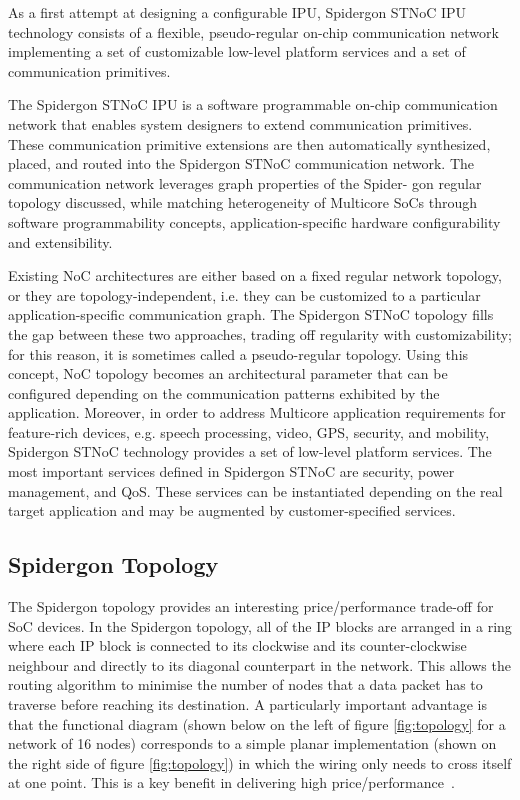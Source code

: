 As a first attempt at designing a configurable IPU, Spidergon STNoC IPU technology consists of a flexible, pseudo-regular on-chip communication network implementing a set of customizable low-level platform services and a set of communication primitives.

The Spidergon STNoC IPU is a software programmable on-chip communication network that enables system designers to extend communication primitives. 
These communication primitive extensions are then automatically synthesized, placed, and routed into the Spidergon STNoC communication network. 
The communication network leverages graph properties of the Spider- gon regular topology discussed, while matching heterogeneity of Multicore SoCs through software programmability concepts, application-specific hardware configurability and extensibility.

Existing NoC architectures are either based on a fixed regular network topology, or they are topology-independent, i.e. they can be customized to a particular application-specific communication graph. 
The Spidergon STNoC topology fills the gap between these two approaches, trading off regularity with customizability; for this reason, it is sometimes called a pseudo-regular topology\cite{coppola2008design}. 
Using this concept, NoC topology becomes an architectural parameter that can be configured depending on the communication patterns exhibited by the application. 
Moreover, in order to address Multicore application requirements for feature-rich devices, e.g. speech processing, video, GPS, security, and mobility, Spidergon STNoC technology provides a set of low-level platform services. 
The most important services defined in Spidergon STNoC are security, power management, and QoS. 
These services can be instantiated depending on the real target application and may be augmented by customer-specified services.

\subsection{Spidergon Topology}\label{S:topology}

The Spidergon topology provides an interesting price/performance trade-off for SoC devices. 
In the Spidergon topology, all of the IP blocks are arranged in a ring where each IP block is connected to its clockwise and its counter-clockwise neighbour and directly to its diagonal counterpart in the network. 
This allows the routing algorithm to minimise the number of nodes that a data packet has to traverse before reaching its destination. 
A particularly important advantage is that the functional diagram (shown below on the left of figure \ref{fig:topology} for a network of 16 nodes) corresponds to a simple planar implementation (shown on the right side of figure \ref{fig:topology}) in which the wiring only needs to cross itself at one point. This is a key benefit in delivering high price/performance~\cite{STMicroelectronics2005}.


